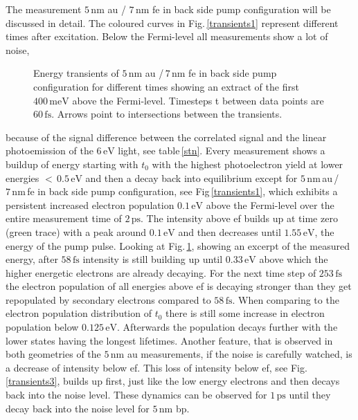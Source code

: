 \documentclass[a4paper,12pt,twoside]{article}
\begin{document}
 The measurement  $5\,\mathrm{\mbox{nm}}$ \gls{au} / $7\,\mathrm{nm}$ \gls{fe} in back side pump configuration will be discussed in detail. The coloured curves in Fig.\,\ref{transients1} represent different times after excitation. Below the Fermi-level all measurements show a lot of noise,\begin{figure}
	\caption{Energy transients of $5\,\mathrm{\mbox{nm}}$ \gls{au} /\,$7\,\mathrm{\mbox{nm}}$ \gls{fe} in back side pump configuration for different times showing an extract of the first $400\,\mathrm{meV}$ above the Fermi-level. Timesteps \textDelta t between data points are $60\,\mathrm{fs}$. Arrows point to intersections between the transients.}
    		\label{transients2}
	\end{figure} because of the signal difference between the correlated signal and the linear photoemission of the $6\,\mathrm{eV}$ light, see table\,\ref{stn}.
Every measurement shows a buildup of energy starting with $t_0$ with the highest photoelectron yield at lower energies $<\,0.5\,\mathrm{eV}$ and then a decay back into equilibrium except for $5\,\mathrm{nm}$\,\gls{au}\,/\,$7\,\mathrm{nm}$\,\gls{fe} in back side pump configuration, see Fig\,\ref{transients1}, which exhibits a persistent increased electron population $0.1\,\mathrm{eV}$ above the Fermi-level over the entire measurement time of $2\,\mathrm{ps}$.
The intensity above \gls{ef} builds up at time zero (green trace) with a peak around $0.1\,\mathrm{\mbox{eV}}$ and then decreases until $1.55\,\mathrm{\mbox{eV}}$, the energy of the pump pulse. Looking at Fig.\,\ref{transients2}, showing an excerpt of the measured energy, after $58\,\mathrm{\mbox{fs}}$ intensity is still building up until $0.33\,\mathrm{\mbox{eV}}$ above which the higher energetic electrons are already decaying. For the next time step of $253\,\mathrm{\mbox{fs}}$ the electron population of all energies above \gls{ef} is decaying stronger than they get repopulated by secondary electrons compared to $58\,\mathrm{\mbox{fs}}$. When comparing to the electron population distribution of $t_0$ there is still some increase in electron population below $0.125\,\mathrm{eV}$. Afterwards the population decays further with the lower states having the longest lifetimes. Another feature, that is observed in both geometries of the $5\,\mathrm{\mbox{nm}}$ \gls{au} measurements, if the noise is carefully watched, is a decrease of intensity below \gls{ef}. This loss of intensity below \gls{ef}, see Fig.\,\ref{transients3}, builds up first, just like the low energy electrons and then decays back into the noise level. These dynamics can be observed for $1\,\mathrm{\mbox{ps}}$ until they decay back into the noise level for $5\,\mathrm{\mbox{nm}}$ \gls{bp}.
\end{document}

